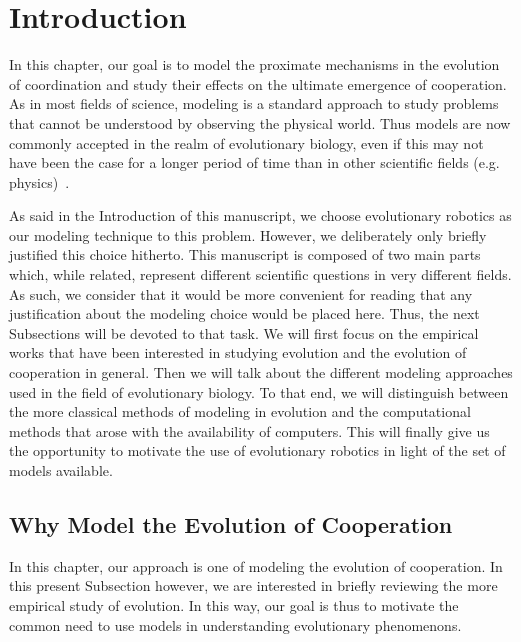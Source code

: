 \section{Introduction}

  In this chapter, our goal is to model the proximate mechanisms in the evolution of coordination and study their effects on the ultimate emergence of cooperation. As in most fields of science, modeling is a standard approach to study problems that cannot be understood by observing the physical world. Thus models are now commonly accepted in the realm of evolutionary biology, even if this may not have been the case for a longer period of time than in other scientific fields (e.g. physics)~\parencite{Shou2015}. 

  As said in the Introduction of this manuscript, we choose evolutionary robotics as our modeling technique to this problem. However, we deliberately only briefly justified this choice hitherto. This manuscript is composed of two main parts which, while related, represent different scientific questions in very different fields. As such, we consider that it would be more convenient for reading that any justification about the modeling choice would be placed here. Thus, the next Subsections will be devoted to that task. We will first focus on the empirical works that have been interested in studying evolution and the evolution of cooperation in general. Then we will talk about the different modeling approaches used in the field of evolutionary biology. To that end, we will distinguish between the more classical methods of modeling in evolution and the computational methods that arose with the availability of computers. This will finally give us the opportunity to motivate the use of evolutionary robotics in light of the set of models available.


  \subsection{Why Model the Evolution of Cooperation}

    In this chapter, our approach is one of modeling the evolution of cooperation. In this present Subsection however, we are interested in briefly reviewing the more empirical study of evolution. In this way, our goal is thus to motivate the common need to use models in understanding evolutionary phenomenons.

